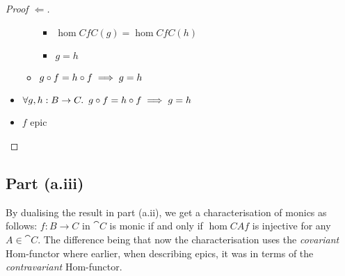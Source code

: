 \begin{prop}
\begin{proof}[Proof $\Leftarrow$]
\begin{itemize}
\begin{itemize}
\begin{itemize}
            \item[\iffs] $\hom{C}{f}{C}(g) = \hom{C}{f}{C}(h)$
              \marginnote{\Def-\ref{def:contra-hom}}

            \item[\imps] $g = h$
            \end{itemize}

          \item[\imps] $g\circ f = h\circ f \implies g = h$
            \marginnote{\imps-\Intro-$\dagger$}
        \end{itemize}
      \item[\imps] $\forall g, h : B \to C\ldotp~g\circ f = h\circ f \implies g = h$
        \marginnote{$\forall$-\Intro-$\star$}

      \item[\iffs] $f$ epic
        \qedhere
    \end{itemize}
  \end{proof}
\end{prop}

\subsection{Part (a.iii)}\label{sec:q-1-a-iii}
By dualising the result in part (a.ii), we get a characterisation of monics as follows: $f : B\to C$ in $\cat{C}$ is monic if and only if $\hom{C}{A}{f}$ is injective for any $A\in\cat{C}$. The difference being that now the characterisation uses the \textit{covariant} Hom-functor where earlier, when describing epics, it was in terms of the \textit{contravariant} Hom-functor.

